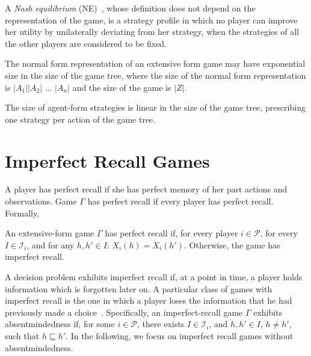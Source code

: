 A \emph{Nash equilibrium} (NE)~\citep{nash1950eqnplayers}, whose definition does not depend on the representation of the game, is a strategy profile in which no player can improve her utility by unilaterally deviating from her strategy, when the strategies of all the other players are considered to be fixed.

\begin{obs}  The normal form representation of an extensive form game may have exponential size in the size of the game tree, where the size of the normal form representation is $|A_1||A_2|$ ... $|A_n|$ and the size of the game is $|Z|$.
\end{obs}

\begin{obs} \label{obs_nonexp} The size of agent-form strategies is linear in the size of the game tree, prescribing one strategy per action of the game tree.
\end{obs}


\section{Imperfect Recall Games}


A player has perfect recall if she has perfect memory of her past actions and observations. Game $\Gamma$ has perfect recall if every player has perfect recall. Formally,
\begin{definition}\label{def:perfect_rec}
	An extensive-form game $\Gamma$ has perfect recall if, for every player $i\in \mathcal{P}$, for every $I\in\mathcal{I}_i$, and for any $h,h'\in I$: $X_i(h)=X_i(h')$. Otherwise, the game has imperfect recall.
\end{definition}



\noindent 
A decision problem exhibits imperfect recall if, at a point in time, a player holds information which is forgotten later on.
A particular class of games with imperfect recall is the one in which a player loses the information that he had previously made a choice~\citep{piccione1997}. Specifically, an imperfect-recall game $\Gamma$ exhibits absentmindedness if, for some $i\in \mathcal{P}$, there exists $I\in\mathcal{I}_i$, and $h,h'\in I$, $h\neq h'$, such that $h\sqsubseteq h'$. In the following, we focus on imperfect recall games without absentmindedness.

